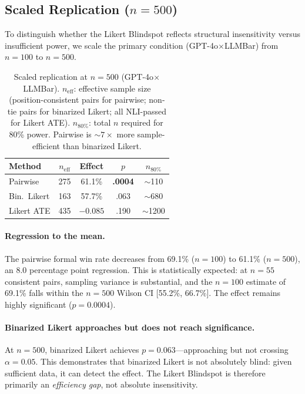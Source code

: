 \documentclass[11pt,a4paper]{article}
\newcommand{\sig}[1]{\textcolor{siggreen}{\textbf{#1}}}
\begin{document}
\subsection{Scaled Replication ($n{=}500$)}
\label{sec:exp_scaled}

To distinguish whether the Likert Blindspot reflects structural insensitivity versus insufficient power, we scale the primary condition (GPT-4o$\times$LLMBar) from $n{=}100$ to $n{=}500$.

\begin{table}[t]
\centering
\small
\begin{tabular}{@{}lcccc@{}}
\toprule
\textbf{Method} & $n_\text{eff}$ & \textbf{Effect} & $p$ & $n_{80\%}$ \\
\midrule
Pairwise & 275 & 61.1\% & \sig{.0004} & $\sim$110 \\
Bin.\ Likert & 163 & 57.7\% & .063 & $\sim$680 \\
Likert ATE & 435 & $-0.085$ & .190 & $\sim$1200 \\
\bottomrule
\end{tabular}
\caption{Scaled replication at $n{=}500$ (GPT-4o$\times$LLMBar). $n_\text{eff}$: effective sample size (position-consistent pairs for pairwise; non-tie pairs for binarized Likert; all NLI-passed for Likert ATE). $n_{80\%}$: total $n$ required for 80\% power. Pairwise is ${\sim}7\times$ more sample-efficient than binarized Likert.}
\label{tab:scaled}
\end{table}

\paragraph{Regression to the mean.}
The pairwise formal win rate decreases from 69.1\% ($n{=}100$) to 61.1\% ($n{=}500$), an 8.0 percentage point regression.
This is statistically expected: at $n{=}55$ consistent pairs, sampling variance is substantial, and the $n{=}100$ estimate of 69.1\% falls within the $n{=}500$ Wilson CI [55.2\%, 66.7\%].
The effect remains highly significant ($p{=}0.0004$).

\paragraph{Binarized Likert approaches but does not reach significance.}
At $n{=}500$, binarized Likert achieves $p{=}0.063$---approaching but not crossing $\alpha{=}0.05$.
This demonstrates that binarized Likert is not absolutely blind: given sufficient data, it can detect the effect.
The Likert Blindspot is therefore primarily an \textit{efficiency gap}, not absolute insensitivity.
\end{document}
